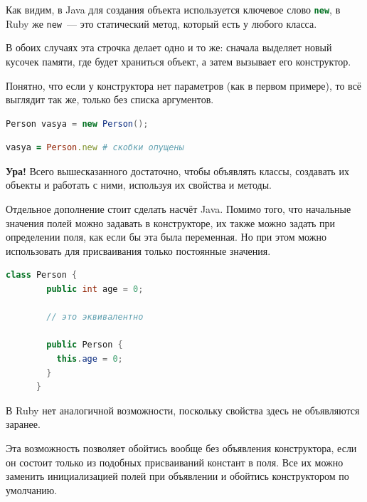 \documentclass[a4paper, 14pt, titlepage]{extarticle}
\newcommand{\strong}[1]{\textbf{#1}}
\newenvironment{halfpage}%
    {\noindent\begin{minipage}[h]{0.49\linewidth}} %
    {\end{minipage}\hfill}
\newcommand{\inlinecode}[2][Java]{\lstinline[basicstyle=\ttfamily, language=#1]{#2}}
\begin{document}
  Как видим, в Java для создания объекта используется ключевое слово \inlinecode[Java]{new}, в Ruby
  же \inlinecode[Ruby]{new}~--- это статический метод, который есть у любого класса.

  В обоих случаях эта строчка делает одно и то же: сначала выделяет новый кусочек памяти, где будет
  храниться объект, а затем вызывает его конструктор.
  
  Понятно, что если у конструктора нет параметров (как в первом примере), то всё выглядит так же,
  только без списка аргументов.

  \begin{halfpage}
    \begin{lstlisting}[language=Java, title={Создание объекта в Java}, gobble=6, texcl]
      Person vasya = new Person();
    \end{lstlisting}
  \end{halfpage}
  \begin{halfpage}
    \begin{lstlisting}[language=Ruby, title={Создание объекта в Ruby}, gobble=6, texcl]
      vasya = Person.new # скобки опущены
    \end{lstlisting}
  \end{halfpage}

  \vspace{1cm}

  \strong{Ура!} Всего вышесказанного достаточно, чтобы объявлять классы, создавать их объекты и
  работать с ними, используя их свойства и методы.

  \begin{center}
    \begin{halfpage}
      \hrulefill
    \end{halfpage}
  \end{center}

  Отдельное дополнение стоит сделать насчёт Java. Помимо того, что начальные значения полей можно
  задавать в конструкторе, их также можно задать при определении поля, как если бы эта была
  переменная. Но при этом можно использовать для присваивания только постоянные значения.

  \begin{halfpage}
    \begin{lstlisting}[language=Java, title={Инициализация поля в Java}, gobble=6, texcl]
      class Person {
        public int age = 0;
        
        // это эквивалентно

        public Person {
          this.age = 0;
        }
      }
    \end{lstlisting}
  \end{halfpage}
  \begin{halfpage}
    В Ruby нет аналогичной возможности, поскольку свойства здесь не объявляются заранее.
  \end{halfpage}

  Эта возможность позволяет обойтись вообще без объявления конструктора, если он состоит только из
  подобных присваиваний констант в поля. Все их можно заменить инициализацией полей при объявлении и
  обойтись конструктором по умолчанию.
\end{document}
